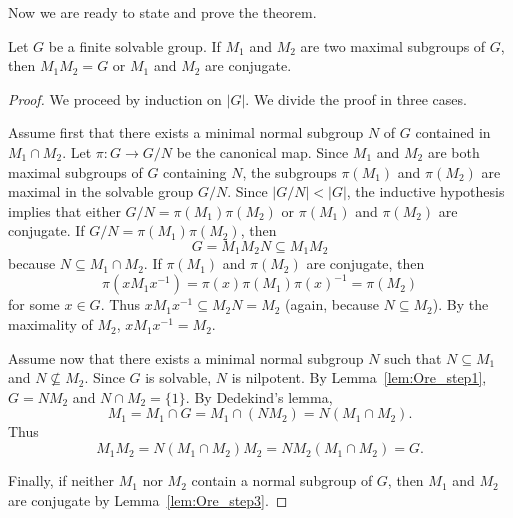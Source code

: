 Now we are ready to state and prove the theorem. 

\begin{theorem}[Ore]
\label{thm:Ore}
    Let $G$ be a finite solvable group. If $M_1$ and $M_2$ 
    are two maximal subgroups of $G$, then 
    $M_1M_2=G$ or $M_1$ and $M_2$ are conjugate. 
\end{theorem}

\begin{proof}
    We proceed by induction on $|G|$. We divide the proof in three cases. 
    
    Assume first that there exists a minimal normal
    subgroup $N$ of $G$ contained in $M_1\cap M_2$. Let 
    $\pi\colon G\to G/N$ be the canonical map. Since $M_1$ and $M_2$ are both maximal subgroups of $G$ containing $N$, 
    the subgroups $\pi(M_1)$ and $\pi(M_2)$ 
    are maximal in the solvable group $G/N$. Since 
    $|G/N|<|G|$, the inductive hypothesis 
    implies that either $G/N=\pi(M_1)\pi(M_2)$ or
    $\pi(M_1)$ and $\pi(M_2)$ are conjugate. If $G/N=\pi(M_1)\pi(M_2)$, then
    \[
    G=M_1M_2N\subseteq M_1M_2
    \]
    because $N\subseteq M_1\cap M_2$.  
    If $\pi(M_1)$ and 
    $\pi(M_2)$ are conjugate, then 
    \[
    \pi(xM_1x^{-1})=\pi(x)\pi(M_1)\pi(x)^{-1}=\pi(M_2)
    \]
    for some $x\in G$. Thus $xM_1x^{-1}\subseteq M_2N=M_2$ (again, because $N\subseteq M_2$). 
    By the maximality of $M_2$, $xM_1x^{-1}=M_2$.  

    Assume now that there exists a minimal normal subgroup $N$ such that 
    $N\subseteq M_1$ and $N\not\subseteq M_2$. 
    Since $G$ is solvable, $N$ is nilpotent. By Lemma~\ref{lem:Ore_step1}, 
    $G=NM_2$ and $N\cap M_2=\{1\}$. By Dedekind's lemma,
    \[
    M_1=M_1\cap G=M_1\cap (NM_2)=N(M_1\cap M_2).
    \]
    Thus
    \[
    M_1M_2=N(M_1\cap M_2)M_2=NM_2(M_1\cap M_2)=G. 
    \]

    Finally, if neither $M_1$ nor $M_2$ contain a normal subgroup of $G$, 
    then $M_1$ and $M_2$ are conjugate by Lemma~\ref{lem:Ore_step3}. 
\end{proof}

    

